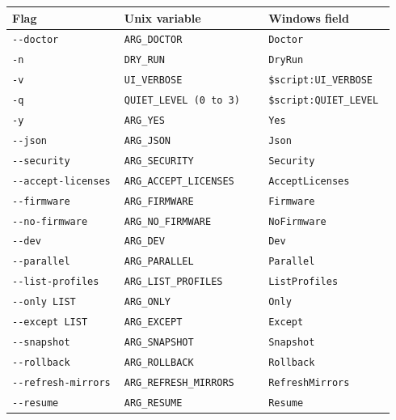 \documentclass[11pt,a4paper]{article}
\begin{document}
\begin{center}
\begin{longtable}{@{}p{0.28\linewidth} p{0.36\linewidth} p{0.30\linewidth}@{}}
\toprule
\textbf{Flag} & \textbf{Unix variable} & \textbf{Windows field} \\
\midrule \endhead
\texttt{-{}-doctor}                  & \texttt{ARG\_DOCTOR} & \texttt{Doctor} \\
\texttt{-n}                          & \texttt{DRY\_RUN} & \texttt{DryRun} \\
\texttt{-v}                          & \texttt{UI\_VERBOSE} & \texttt{\$script:UI\_VERBOSE} \\
\texttt{-q}                          & \texttt{QUIET\_LEVEL (0 to 3)} & \texttt{\$script:QUIET\_LEVEL} \\
\texttt{-y}                          & \texttt{ARG\_YES} & \texttt{Yes} \\
\texttt{-{}-json}                    & \texttt{ARG\_JSON} & \texttt{Json} \\
\texttt{-{}-security}                & \texttt{ARG\_SECURITY} & \texttt{Security} \\
\texttt{-{}-accept-licenses}         & \texttt{ARG\_ACCEPT\_LICENSES} & \texttt{AcceptLicenses} \\
\texttt{-{}-firmware}                & \texttt{ARG\_FIRMWARE} & \texttt{Firmware} \\
\texttt{-{}-no-firmware}             & \texttt{ARG\_NO\_FIRMWARE} & \texttt{NoFirmware} \\
\texttt{-{}-dev}                     & \texttt{ARG\_DEV} & \texttt{Dev} \\
\texttt{-{}-parallel}                & \texttt{ARG\_PARALLEL} & \texttt{Parallel} \\
\texttt{-{}-list-profiles}           & \texttt{ARG\_LIST\_PROFILES} & \texttt{ListProfiles} \\
\texttt{-{}-only LIST}               & \texttt{ARG\_ONLY} & \texttt{Only} \\
\texttt{-{}-except LIST}             & \texttt{ARG\_EXCEPT} & \texttt{Except} \\
\texttt{-{}-snapshot}                & \texttt{ARG\_SNAPSHOT} & \texttt{Snapshot} \\
\texttt{-{}-rollback}                & \texttt{ARG\_ROLLBACK} & \texttt{Rollback} \\
\texttt{-{}-refresh-mirrors}         & \texttt{ARG\_REFRESH\_MIRRORS} & \texttt{RefreshMirrors} \\
\texttt{-{}-resume}                  & \texttt{ARG\_RESUME} & \texttt{Resume} \\

\end{longtable}
\end{center}
\end{document}
